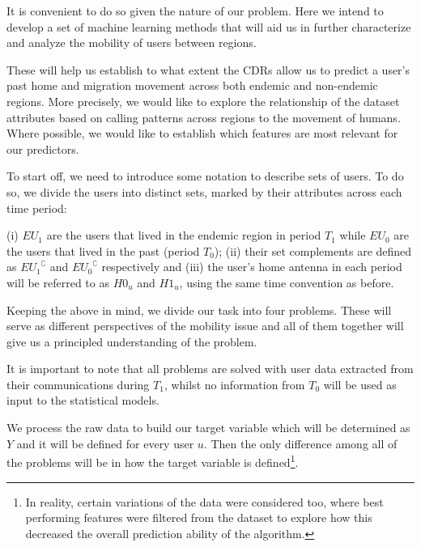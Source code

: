 It is convenient to do so given the nature of our problem.
Here we intend to develop a set of machine learning methods that will aid us in further characterize and analyze the mobility of users between regions.

These will help us establish to what extent the CDRs allow us to predict a user's past home and migration movement across both endemic and non-endemic regions.
More precisely, we would like to explore the relationship of the dataset attributes based on calling patterns across regions to the movement of humans.
Where possible, we would like to establish which features are most relevant for our predictors.

To start off, we need to introduce some notation to describe sets of users.
To do so, we divide the users into distinct sets, marked by their attributes across each time period:

\begin{definition}\label{def:endemic_sets_periods}
	(i) $EU_{1}$ are the users that lived in the endemic region in period $T_1$ while $EU_{0}$ are the users that lived in the past (period $T_0$);
	(ii) their set complements are defined as ${ EU_1 }^{\complement}$ and ${ EU_0 }^{\complement}$ respectively and
	(iii) the user's home antenna in each period will be referred to as $H0_u$ and $H1_u$, using the same time convention as before.
\end{definition}




Keeping the above in mind, we divide our task into four problems.
These will serve as different perspectives of the mobility issue and all of them together will give us a principled understanding of the problem.

It is important to note that all problems are solved with user data extracted from their communications during $T_1$, whilst no information from $T_0$ will be used as input to the statistical models.

We process the raw data to build our target variable which will be determined as $Y$ and it will be defined for every user $u$.
Then the only difference among all of the problems will be in how the target variable is defined\footnote{In reality, certain variations of the data were considered too, where best performing features were filtered from the dataset to explore how this decreased the overall prediction ability of the algorithm.}.


